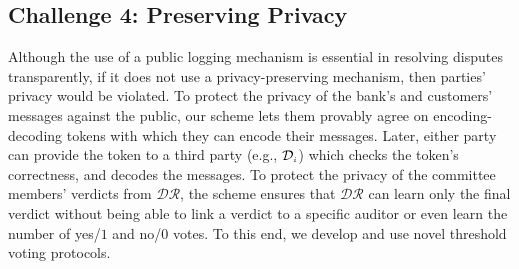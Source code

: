 \vspace{-4mm}
\subsection{Challenge 4: Preserving Privacy}
 Although the use of a public logging mechanism is essential in resolving disputes transparently, if it does not use a  privacy-preserving mechanism, then parties' privacy would be violated. To protect the privacy of the bank's and customers' messages against the public, our scheme lets them provably agree on encoding-decoding tokens with which they can encode their messages. Later, either party can provide the token to a third party  (e.g., $\mathcal{D}_{\scriptscriptstyle i}$) which checks the token's correctness, and decodes the messages. To protect the privacy of the committee members' verdicts from $\mathcal{DR}$, the scheme ensures that  $\mathcal{DR}$ can learn only the final verdict without being able to link a verdict to a specific auditor or even learn the number of yes/$1$ and no/$0$ votes. To this end, we develop and use novel threshold voting protocols. 
 
 
 
 